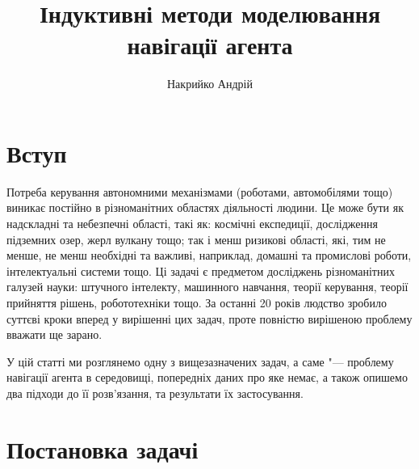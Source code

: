 \documentclass[a4paper,10pt,fleqn,draft]{article}
\title{Індуктивні методи моделювання навігації агента}
\author{Накрийко Андрій}
\begin{document}
\maketitle

\section{Вступ}

Потреба керування автономними механізмами (роботами, автомобілями тощо) виникає постійно в різноманітних областях діяльності людини. Це може бути як надскладні та небезпечні області, такі як: космічні експедиції, дослідження підземних озер, жерл вулкану тощо; так і менш ризикові області, які, тим не менше, не менш необхідні та важливі, наприклад, домашні та промислові роботи, інтелектуальні системи тощо. Ці задачі є предметом досліджень різноманітних галузей науки: штучного інтелекту, машинного навчання, теорії керування, теорії прийняття рішень, робототехніки тощо. За останні 20 років людство зробило суттєві кроки вперед у вирішенні цих задач, проте повністю вирішеною проблему вважати ще зарано.

У цій статті ми розглянемо одну з вищезазначених задач, а саме "--- проблему навігації агента в середовищі, попередніх даних про яке немає, а також опишемо два підходи до її розв'язання, та результати їх застосування.

\section{Постановка задачі}
\end{document}
